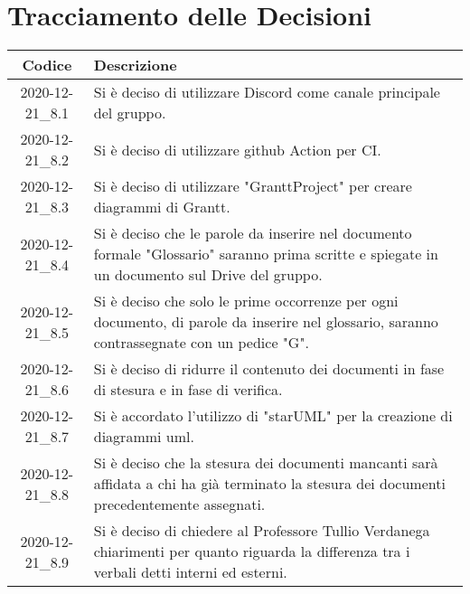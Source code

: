 \section*{Tracciamento delle Decisioni}

\begin{center}
	\begin{longtable}{|c|p{13cm}|}
	\hline
	\rowcolor{lighter-grayer}
	\textbf{Codice} & \textbf{Descrizione} \\
	\hline
	\endfirsthead

	
	2020-12-21\_8.1 & Si è deciso di utilizzare Discord come canale principale del gruppo. \\
	\hline
	2020-12-21\_8.2 & Si è deciso di utilizzare github Action per CI. \\
	\hline
	2020-12-21\_8.3 & Si è deciso di utilizzare "GranttProject" per creare diagrammi di Grantt.  \\
	\hline
	2020-12-21\_8.4 & Si è deciso che le parole da inserire nel documento formale "Glossario" saranno prima scritte e spiegate in un documento sul Drive del gruppo.  \\
	\hline
	2020-12-21\_8.5 & Si è deciso che solo le prime occorrenze per ogni documento, di parole da inserire nel glossario, saranno contrassegnate con un pedice "G". \\
	\hline
	2020-12-21\_8.6 & Si è deciso di ridurre il contenuto dei documenti in fase di stesura e in fase di verifica. \\
	\hline
	2020-12-21\_8.7 & Si è accordato l'utilizzo di "starUML" per la creazione di diagrammi uml.  \\
	\hline
	2020-12-21\_8.8 & Si è deciso che la stesura dei documenti mancanti sarà affidata a chi ha già terminato la stesura dei documenti precedentemente assegnati.  \\
	\hline
	2020-12-21\_8.9 & Si è deciso di chiedere al Professore Tullio Verdanega chiarimenti per quanto riguarda la differenza tra i verbali detti interni ed esterni.  \\
	

	\end{longtable}
\end{center}